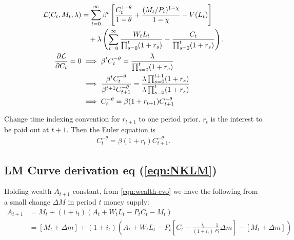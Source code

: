\documentclass[../main.tex]{subfiles}
\begin{document}
        \begin{align}
            \mathcal{L}(C_t, M_t, \lambda)
            &= \sum_{t=0}^\infty \beta^t
            \left[
                \frac{C_t^{1-\theta}}{1-\theta}
                + \frac{(M_t/P_t)^{1-\chi}}{1-\chi}
                - V(L_t)
            \right] \\
            &\quad + \lambda \left(
                \sum_{t=0}^\infty \frac{W_t L_t}{\prod_{s=0}^{t}(1+r_s)} - \frac{C_t}{\prod_{s=0}^{t}(1+r_s)}
            \right).
            \\
            \frac{\partial\mathcal{L}}{\partial C_t} = 0
            &\implies \beta^t C_t^{-\theta}
            = \frac{\lambda}{\prod_{s=0}^{t}(1+r_s)}
            \\
            &\implies
            \frac{\beta^t C_t^{-\theta}}{\beta^{t+1} C_{t+1}^{-\theta}}
            =  \frac{\lambda \prod_{s=0}^{t+1}(1+r_s)}{\lambda \prod_{s=0}^{t}(1+r_s)}
            \\
            &\implies
            C_t^{-\theta}
            =  \beta (1+r_{t+1}) C_{t+1}^{-\theta}
        \end{align}
        
        Change time indexing convention for $r_{t+1}$ to one period prior. $r_{t}$ is the interest to be paid out at $t+1$. Then the Euler equation is
        \begin{align}
            C_t^{-\theta}
            =  \beta (1+r_t) C_{t+1}^{-\theta}.
        \end{align}
    
    
    \subsection{LM Curve derivation eq (\ref{eqn:NKLM})}\label{calc:NKLM}
        
        Holding wealth $A_{t+1}$ constant, from \eqref{eqn:wealth-evo} we have the following from a small change $\Delta M$ in period $t$ money supply:
        \begin{align}
            A_{t+1}
            &= M_t + (1+i_t)(A_t + W_t L_t - P_t C_t - M_t)
            \\
            &= [M_t + \Delta m]
            + (1+i_t)\left(
              A_t + W_t L_t
              - P_t \left[C_t - \frac{i_t}{(1+i_t)}\frac{1}{P_t} \Delta m\right]
              - [M_t + \Delta m]
              \right)
        \end{align}
        
\end{document}
